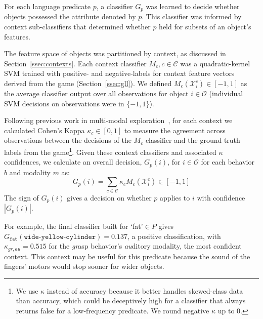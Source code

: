 For each language predicate $p$, a classifier $G_p$ was learned to decide whether objects possessed the attribute denoted by $p$.
This classifier was informed by context sub-classifiers that determined whether $p$ held for subsets of an object's features.

The feature space of objects was partitioned by context, as discussed in Section~\ref{ssec:contexts}.
Each context classifier $M_{c}, c\in\mathcal{C}$ was a quadratic-kernel SVM trained with positive- and negative-labels for context feature vectors derived from the \ispy game (Section~\ref{ssec:gll}).
We defined $M_{c}(\mathcal{X}_i^c)\in [-1,1]$ as the average classifier output over all observations for object $i\in\mathcal{O}$ (individual SVM decisions on observations were in $\{-1,1\}$).

Following previous work in multi-modal exploration~\cite{sinapov:icra14}, for each context we calculated Cohen's Kappa $\kappa_{c}\in[0,1]$ to measure the agreement across observations between the decisions of the $M_{c}$ classifier and the ground truth labels from the \ispy game\footnote{We use $\kappa$ instead of accuracy because it better handles skewed-class data than accuracy, which could be deceptively high for a classifier that always returns false for a low-frequency predicate. We round negative $\kappa$ up to $0$.}.
Given these context classifiers and associated $\kappa$ confidences, we calculate an overall decision, $G_p(i)$, for $i\in\mathcal{O}$ for each behavior $b$ and modality $m$ as:
\begin{equation}
	G_p(i) = \sum_{c\in\mathcal{C}}{\kappa_{c} M_{c}(\mathcal{X}_i^c)} \in [-1,1]
\end{equation}
The sign of $G_p(i)$ gives a decision on whether $p$ applies to $i$ with confidence $|G_p(i)|$.

For example, the final classifier built for `fat'$\in P$ gives $G_{\texttt{fat}}(\texttt{wide-yellow-cylinder}) = 0.137$, a positive classification, with $\kappa_{gr,au}=0.515$ for the \textit{gr}asp behavior's \textit{au}ditory modality, the most confident context. This context may be useful for this predicate because the sound of the fingers' motors would stop sooner for wider objects.